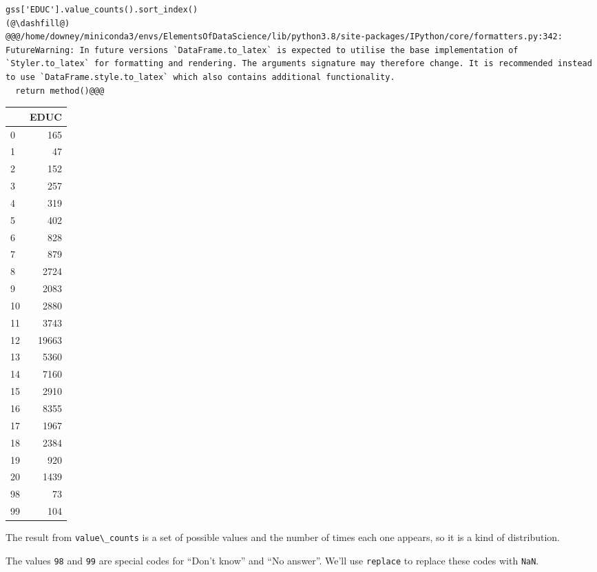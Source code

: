 \begin{lstlisting}[]
gss['EDUC'].value_counts().sort_index()
(@\dashfill@)
@@@/home/downey/miniconda3/envs/ElementsOfDataScience/lib/python3.8/site-packages/IPython/core/formatters.py:342: FutureWarning: In future versions `DataFrame.to_latex` is expected to utilise the base implementation of `Styler.to_latex` for formatting and rendering. The arguments signature may therefore change. It is recommended instead to use `DataFrame.style.to_latex` which also contains additional functionality.
  return method()@@@
\end{lstlisting}

\begin{tabular}{lr}
\midrule
{} &   EDUC \\
\midrule
0  &    165 \\
1  &     47 \\
2  &    152 \\
3  &    257 \\
4  &    319 \\
5  &    402 \\
6  &    828 \\
7  &    879 \\
8  &   2724 \\
9  &   2083 \\
10 &   2880 \\
11 &   3743 \\
12 &  19663 \\
13 &   5360 \\
14 &   7160 \\
15 &   2910 \\
16 &   8355 \\
17 &   1967 \\
18 &   2384 \\
19 &    920 \\
20 &   1439 \\
98 &     73 \\
99 &    104 \\
\midrule
\end{tabular}

The result from \passthrough{\lstinline!value\_counts!} is a set of
possible values and the number of times each one appears, so it is a
kind of distribution.

The values \passthrough{\lstinline!98!} and \passthrough{\lstinline!99!}
are special codes for ``Don't know'' and ``No answer''. We'll use
\passthrough{\lstinline!replace!} to replace these codes with
\passthrough{\lstinline!NaN!}.

